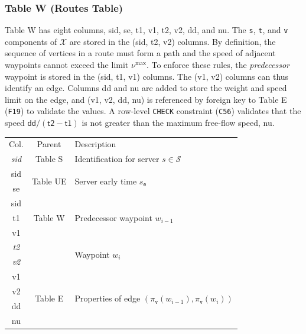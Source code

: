 \documentclass{article}
\theoremstyle{definition}
\begin{document}
\subsubsection{Table W (Routes Table)}
Table W has eight columns, \textsf{sid}, \textsf{se}, \textsf{t1}, \textsf{v1},
\textsf{t2}, \textsf{v2}, \textsf{dd}, and \textsf{nu}.  The \texttt{s},
\texttt{t}, and \texttt{v} components of $\mathcal{X}$ are stored in the
(\textsf{sid}, \textsf{t2}, \textsf{v2}) columns.  By definition, the sequence
of vertices in a route must form a path and the speed of adjacent waypoints
cannot exceed the limit $\nu^\textrm{max}$.  To enforce these rules, the
\emph{predecessor} waypoint is stored in the (\textsf{sid}, \textsf{t1},
\textsf{v1}) columns.  The (\textsf{v1}, \textsf{v2}) columns can thus identify
an edge. Columns \textsf{dd} and \textsf{nu} are added to store the weight and
speed limit on the edge, and (\textsf{v1}, \textsf{v2}, \textsf{dd},
\textsf{nu}) is referenced by foreign key to Table E ({\tt{}F19}) to validate the
values. A row-level \texttt{CHECK} constraint ({\tt{}C56}) validates that the
speed $\textsf{dd}/(\textsf{t2}-\textsf{t1})$ is not greater than the maximum
free-flow speed, \textsf{nu}.
\begin{table}[h]
\centering
\small
\begin{tabular}{|c|c|l|}
\hline
\rowcolor{TableTitle}
\multicolumn{3}{|c|}{Table W (Routes)} \\
\hline
\rowcolor{TableHeader}
Col. & Parent & Description \\
\hline
\textit{sid} & Table S & Identification for server $s\in\mathcal{S}$ \\
\hline
sid & \multirow{2}{*}{Table UE} & \multirow{2}{*}{Server early time $s_\texttt{e}$} \\
se & & \\
\hline
sid & \multirow{3}{*}{Table W} & \multirow{3}{*}{Predecessor waypoint $w_{i-1}$} \\
t1 & & \\
v1 & & \\
\hline
\textit{t2} & & \multirow{2}{*}{Waypoint $w_i$} \\
\textit{v2} & & \\
\hline
v1 & \multirow{4}{*}{Table E} & \multirow{4}{*}{Properties of edge $(\pi_\texttt{v}(w_{i-1}),\pi_\texttt{v}(w_i))$} \\
v2 & & \\
dd & & \\
nu & & \\
\hline
\end{tabular}
\end{table}
\end{document}
